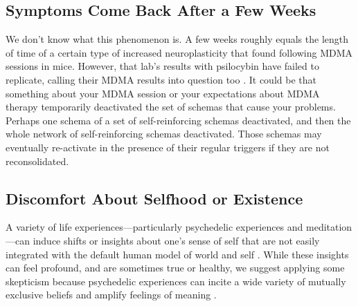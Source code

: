 \documentclass[12pt,letterpaper]{book}
\begin{document}
\subsection*{Symptoms Come Back After a Few Weeks}
We don't know what this phenomenon is. A few weeks roughly equals the length of time of a certain type of increased neuroplasticity that \textcite{nardouMDMAPlasticity} found following MDMA sessions in mice. However, that lab's results with psilocybin have failed to replicate, calling their MDMA results into question too \cite{Lu2025noplasticity}. It could be that something about your MDMA session or your expectations about MDMA therapy temporarily deactivated the set of schemas that cause your problems. Perhaps one schema of a set of self-reinforcing schemas deactivated, and then the whole network of self-reinforcing schemas deactivated. Those schemas may eventually re-activate in the presence of their regular triggers if they are not reconsolidated.
\subsection*{Discomfort About Selfhood or Existence}
\label{selfinsight}
A variety of life experiences—particularly psychedelic experiences and meditation—can induce shifts or insights about one's sense of self that are not easily integrated with the default human model of world and self \cite{evans2020}. While these insights can feel profound, and are sometimes true or healthy, we suggest applying some skepticism because psychedelic experiences can incite a wide variety of mutually exclusive beliefs and amplify feelings of meaning \cite{hartogsohn2018meaning}.
\end{document}

